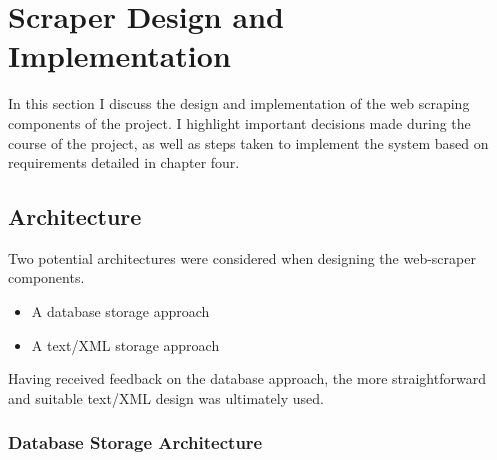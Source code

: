\chapter{Scraper Design and Implementation}\label{C:us}

In this section I discuss the design and implementation of the web scraping components of the project. I highlight important decisions made during the course of the project, as well as steps taken to implement the system based on requirements detailed in chapter four.






\section{Architecture}

Two potential architectures were considered when designing the web-scraper components.

\begin{itemize}
 \item A database storage approach
 \item A text/XML storage approach
\end{itemize}

Having received feedback on the database approach, the more straightforward and suitable text/XML design was ultimately used.

\subsection{Database Storage Architecture}

